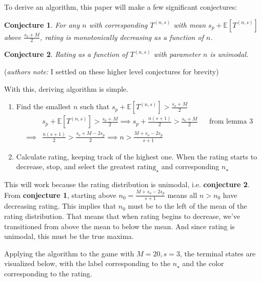 \documentclass[a4paper]{article}
\newtheorem{conjecture}{Conjecture}
\begin{document}
To derive an algorithm, this paper will make a few significant conjectures:
%
\begin{conjecture}
    For any $n$ with corresponding $T^{(n, s)}$ with mean $s_p + \mathbb{E}[T^{(n, s)}]$ above $\frac{s_o + M}{2}$, rating is monotonically decreasing as a function of $n$.
\end{conjecture}
%
\begin{conjecture}
    Rating as a function of $T^{(n, s)}$ with parameter $n$ is unimodal.
\end{conjecture}
%
(\textit{authors note:} I settled on these higher level conjectures for brevity)

With this, deriving algorithm is simple. 

\begin{enumerate}
\item Find the smallest $n$ such that $s_p + \mathbb{E}[T^{(n, s)}] > \frac{s_o + M}{2}$ 
%
\begin{align*}
    & s_p + \mathbb{E}[T^{(n, s)}] > \frac{s_o + M}{2} \implies s_p + \frac{n(s+1)}{2} > \frac{s_o + M}{2} && \text{from lemma 3} \\
    \implies &  \frac{n(s+1)}{2} > \frac{s_o + M - 2 s_p}{2} \implies n > \frac{M + s_o - 2 s_p}{s+1}
\end{align*}

\item Calculate rating, keeping track of the highest one. When the rating starts to decrease, stop, and select the greatest $\text{rating}_{\star}$ and corresponding $n_{\star}$
\end{enumerate}

This will work because the rating distribution is unimodal, i.e. \textbf{conjecture 2}. From \textbf{conjecture 1}, starting above $n_0 = \frac{M + s_o - 2 s_p}{s+1}$ means all $n > n_0$ have decreasing rating. This implies that $n_0$ must be to the left of the mean of the rating distribution. That means that when rating begins to decrease, we've transitioned from above the mean to below the mean. And since rating is unimodal, this must be the true maxima. \newline


Applying the algorithm to the game with $M = 20, s = 3$, the terminal states are visualized below, with the label corresponding to the $n_{\star}$ and the color corresponding to the rating.
\end{document}
